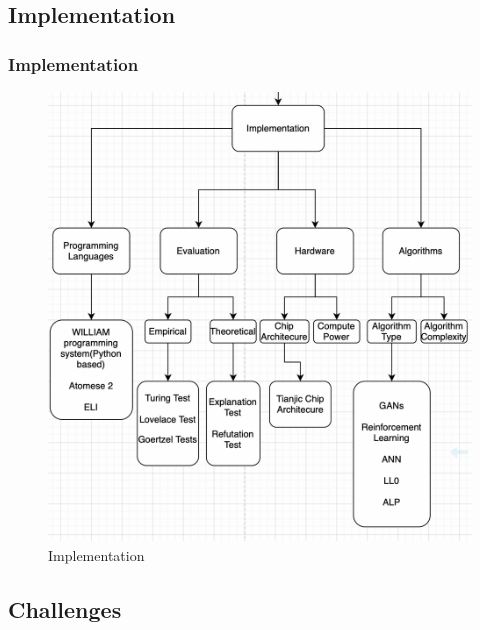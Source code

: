 \documentclass[
	11pt, %
]{beamer}
\begin{document}

\subsection{Implementation}

\begin{frame}
	\frametitle{Implementation}
	
	\begin{figure}
		\includegraphics[width=0.8\linewidth]{Images/implementation.png}
		\caption{Implementation}
	\end{figure}
\end{frame}


\subsection{Challenges}
\end{document}
